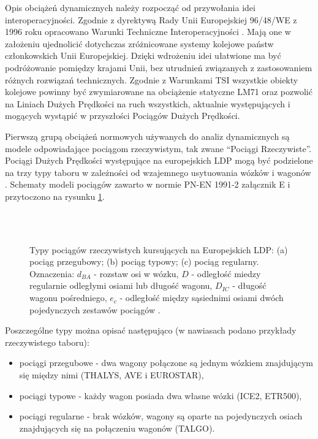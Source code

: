 Opis obciążeń dynamicznych należy rozpocząć od przywołania idei interoperacyjności. Zgodnie z dyrektywą Rady Unii Europejskiej 96/48/WE z 1996 roku opracowano Warunki Techniczne Interoperacyjności  \parencite{Muncke2008}. Mają one w założeniu ujednolicić dotychczas zróżnicowane systemy kolejowe państw członkowskich Unii Europejskiej. Dzięki wdrożeniu idei ułatwione ma być podróżowanie pomiędzy krajami Unii, bez utrudnień związanych z zastosowaniem różnych rozwiązań technicznych. Zgodnie z Warunkami TSI wszystkie obiekty kolejowe powinny być zwymiarowane na obciążenie statyczne LM71 oraz pozwolić na Liniach Dużych Prędkości na ruch wszystkich, aktualnie występujących i mogących wystąpić w przyszłości Pociągów Dużych Prędkości.

Pierwszą grupą obciążeń normowych używanych do analiz dynamicznych są modele odpowiadające pociągom rzeczywistym, tak zwane \enquote{Pociągi Rzeczywiste}. Pociągi Dużych Prędkości występujące na europejskich LDP mogą być podzielone na trzy typy taboru w zależności od wzajemnego usytuowania wózków i wagonów \parencite{Goicolea2008a}. Schematy modeli pociągów zawarto w normie PN-EN 1991-2 załącznik E i przytoczono na rysunku \ref{fig:train_types_EC}. 

\begin{figure}[hbt!]
	\centering
	 \\
	 \\
	\captionsetup{justification=centering}
	\caption{Typy pociągów rzeczywistych kursujących na Europejskich LDP: (a) pociąg przegubowy; (b) pociąg typowy; (c) pociąg regularny. Oznaczenia: $d_{BA}$ - rozstaw osi w wózku, $D$ - odległość miedzy regularnie odległymi osiami lub długość wagonu, $D_{IC}$ - długość wagonu pośredniego, $e_c$ - odległość między sąsiednimi osiami dwóch pojedynczych zestawów pociągów \parencite{PKNj}.}
	\label{fig:train_types_EC}
\end{figure}
Poszczególne typy można opisać następująco (w nawiasach podano przykłady rzeczywistego taboru):
\begin{itemize} 
	\item pociągi przegubowe - dwa wagony połączone są jednym wózkiem znajdującym się między nimi (THALYS, AVE i EUROSTAR),
	\item pociągi typowe - każdy wagon posiada dwa własne wózki (ICE2, ETR500),
	\item pociągi regularne - brak wózków, wagony są oparte na pojedynczych osiach znajdujących się na połączeniu wagonów (TALGO).
\end{itemize}

